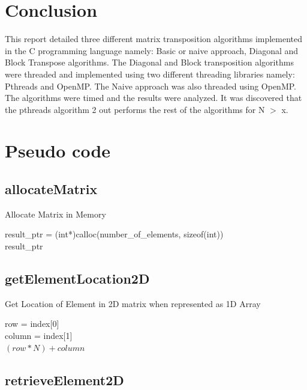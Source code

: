 \documentclass[10pt, onecolumn]{article}
\begin{document}
\section{Conclusion}
%
This report detailed three different matrix transposition algorithms implemented in the C programming language namely: Basic or naive approach, Diagonal and Block Transpose algorithms. The Diagonal and Block transposition algorithms were threaded and implemented using two different threading libraries namely: Pthreads and OpenMP. The Naive approach was also threaded using OpenMP. The algorithms were timed and the results were analyzed. It was discovered that the pthreads algorithm 2 out performs the rest of the algorithms for N $>$ x. 
%
\clearpage
\appendix

\section{Pseudo code}
\label{App:Apendix}
\subsection{allocateMatrix}
    \begin{algorithm}[H]
        \label{Alg:allocateMatrix}
        \caption{Allocate Matrix in Memory}
        result\_ptr = (int*)calloc(number\_of\_elements, sizeof(int)) \\
        \Return result\_ptr
    \end{algorithm}
%
\subsection{getElementLocation2D}

    \begin{algorithm}[H]
        \label{Alg:getElementLocation2D}
        \caption{Get Location of Element in 2D matrix when represented as 1D Array}
        row = index[0]\\
        column = index[1]\\
        \Return $(row*N)+column$
    \end{algorithm}
\subsection{retrieveElement2D}
\end{document}
